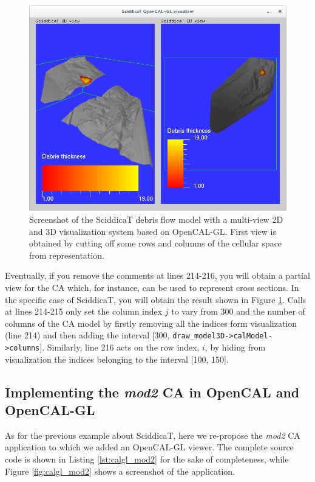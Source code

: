 \begin{figure}
  \begin{center}
    \includegraphics[width=12cm]{./images/OpenCAL/calgl_sciddicaT3}
    \caption{Screenshot of the SciddicaT debris flow model with a
      multi-view 2D and 3D visualization system based on
      OpenCAL-GL. First view is obtained by cutting off some rows and
      columns of the cellular space from representation.}
    \label{fig:calgl_sciddicaT3}
  \end{center}
\end{figure}

Eventually, if you remove the comments at lines 214-216, you will
obtain a partial view for the CA which, for instance, can be used to
represent cross sections. In the specific case of SciddicaT, you will
obtain the result shown in Figure \ref{fig:calgl_sciddicaT3}. Calls at
lines 214-215 only set the column index $j$ to vary from 300 and the
number of columns of the CA model by firstly removing all the indices
form visualization (line 214) and then adding the interval [300,
  \verb'draw_model3D->calModel->columns']. Similarly, line 216 acts on
the row index, $i$, by hiding from visualization the indices
belonging to the interval [100, 150].

\subsection{Implementing the \emph{mod2} CA in OpenCAL and OpenCAL-GL}

As for the previous example about SciddicaT, here we re-propose the
\emph{mod2} CA application to which we added an OpenCAL-GL viewer. The
complete source code is shown in Listing \ref{lst:calgl_mod2} for the
sake of completeness, while Figure \ref{fig:calgl_mod2} shows a
screenshot of the application.

